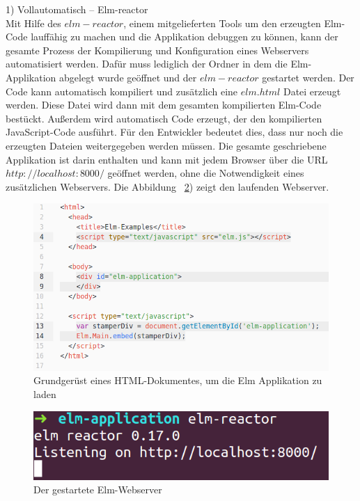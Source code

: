 1) Vollautomatisch – Elm-reactor\\
Mit Hilfe des $elm-reactor$, einem mitgelieferten Tools um den erzeugten Elm-Code lauffähig zu machen und die Applikation debuggen zu können, kann der gesamte Prozess der Kompilierung und Konfiguration eines Webservers automatisiert werden. Dafür muss lediglich der Ordner in dem die Elm-Applikation abgelegt wurde geöffnet und der $elm-reactor$ gestartet werden. 
Der Code kann automatisch kompiliert und zusätzlich eine $elm.html$ Datei erzeugt werden. Diese Datei wird dann mit dem gesamten kompilierten Elm-Code bestückt. Außerdem wird automatisch Code erzeugt, der den kompilierten JavaScript-Code ausführt. Für den Entwickler bedeutet dies, dass nur noch die erzeugten Dateien weitergegeben werden müssen. Die gesamte geschriebene Applikation ist darin enthalten und kann mit jedem Browser über die URL $http://localhost:8000/$ geöffnet werden, ohne die Notwendigkeit eines zusätzlichen Webservers. Die Abbildung ~\ref{fig:elm-reactor}) zeigt den laufenden Webserver.
\begin{figure}[hb]
\centering
\includegraphics[scale=0.4]{img/elm-make_include_in_index.png}
\caption{Grundgerüst eines HTML-Dokumentes, um die Elm Applikation zu laden}\label{fig:html-boilerplate}
\end{figure}
\begin{figure}[t]
\centering
\includegraphics[scale=0.4]{img/elm-reactor.png}
\caption{Der gestartete Elm-Webserver}\label{fig:elm-reactor}
\end{figure}
